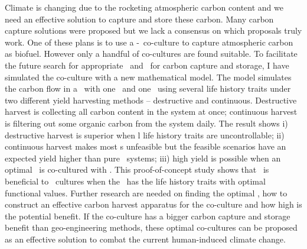 \documentclass[../thesis.tex]{subfiles} %
\begin{document}
Climate is changing due to the rocketing atmospheric carbon content and we need an effective solution to capture and store these carbon.  Many carbon capture solutions were proposed but we lack a consensus on which proposals truly work.  One of these plans is to use a \phy-\bac\ co-culture to capture atmospheric carbon as biofuel.  However only a handful of co-cultures are found suitable.  To facilitate the future search for appropriate \phy\ and \bac\ for carbon capture and storage, I have simulated the co-culture with a new mathematical model.  The model simulates the carbon flow in a \pbs\ with one \phy\ and one \bac\ using several life history traits under two different yield harvesting methods -- destructive and continuous.  Destructive harvest is collecting all carbon content in the system at once; continuous harvest is filtering out some organic carbon from the system daily.  The result shows \Rn{1}) destructive harvest is superior when \bac l life history traits are uncontrollable; \Rn{2}) continuous harvest makes most \pbs s unfeasible but the feasible scenarios have an expected yield higher than pure \phy\ systems; \Rn{3}) high yield is possible when an optimal \bac\ is co-cultured with \phy.  This proof-of-concept study shows that \bac\ is beneficial to \phy\ cultures when the \bac\ has the life history traits with optimal functional values.  Further research are needed on finding the optimal \bac, how to construct an effective carbon harvest apparatus for the co-culture and how high is the potential benefit.  If the co-culture has a bigger carbon capture and storage benefit than geo-engineering methods, these optimal co-cultures can be proposed as an effective solution to combat the current human-induced climate change.
\end{document}
